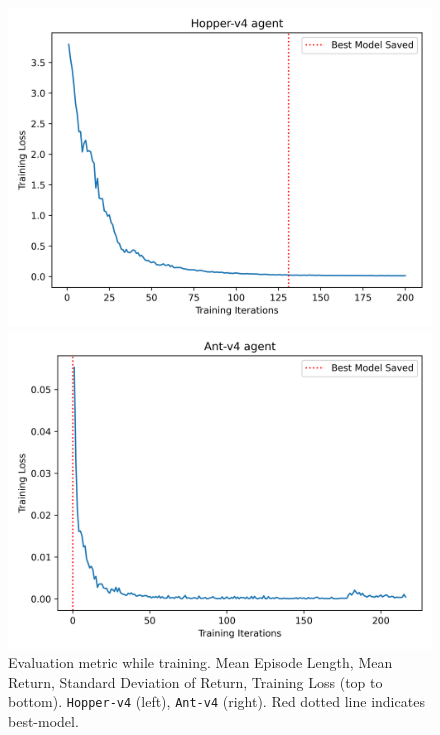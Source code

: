 \begin{figure}[H]
\begin{minipage}{0.42\textwidth}
    \centering
    \includegraphics[width=\linewidth]{plots/Hopper-v4_train_loss.png}
\end{minipage}%
\hfill
\begin{minipage}{0.42\textwidth}
    \centering
    \includegraphics[width=\linewidth]{plots/Ant-v4_train_loss.png}
\end{minipage}

\caption{Evaluation metric while training. Mean Episode Length, Mean Return, Standard Deviation of Return, Training Loss (top to bottom). \texttt{Hopper-v4} (left), \texttt{Ant-v4} (right). Red dotted line indicates best-model.}
\end{figure}
